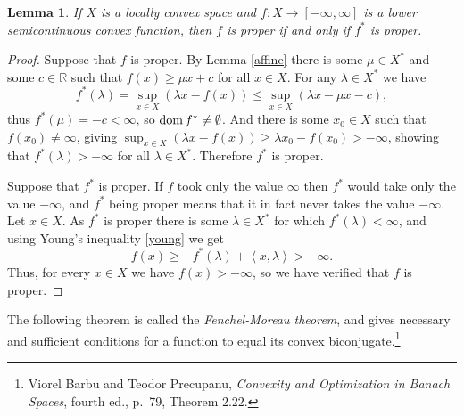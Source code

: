 \documentclass{article}
\newcommand{\inner}[2]{\left\langle #1, #2 \right\rangle}
\newcommand{\dom}{\ensuremath\mathrm{dom}\,}
\newtheorem{lemma}[theorem]{Lemma}
\theoremstyle{definition}
\begin{document}
\begin{lemma}
If $X$ is a locally convex space and $f:X \to [-\infty,\infty]$ is a lower semicontinuous convex function, then $f$ is proper if and only if $f^*$ is proper.
\label{properiff}
\end{lemma}
\begin{proof}
Suppose that $f$ is proper.
By Lemma \ref{affine} there is some $\mu \in X^*$ and some $c \in \mathbb{R}$ such that 
$f(x) \geq \mu x + c$ for all $x \in X$. For
any $\lambda  \in X^*$ we have
\[
f^*(\lambda) = \sup_{x \in X} (\lambda x-f(x)) \leq \sup_{x \in X} (\lambda x -\mu x-c),
\]
thus $f^*(\mu)=-c < \infty$, so $\dom f^* \neq \emptyset$. And there is some $x_0 \in X$ such that
$f(x_0) \neq \infty$, giving $\sup_{x \in X} (\lambda x -f(x)) \geq \lambda x_0 - f(x_0)>-\infty$, showing
that $f^*(\lambda)>-\infty$ for all $\lambda \in X^*$. Therefore $f^*$ is proper.

Suppose that $f^*$ is proper. If $f$ took only the value $\infty$ then $f^*$ would take only  the value $-\infty$, and $f^*$ being proper means that
it in fact never takes the value $-\infty$. Let $x \in X$. As $f^*$ is proper there is some $\lambda \in X^*$ for which
$f^*(\lambda) < \infty$, and using  Young's inequality \eqref{young} we get
\[
f(x) \geq - f^*(\lambda) +\inner{x}{\lambda}>-\infty.
\]
Thus, for every $x \in X$ we have $f(x)>-\infty$, so we have verified that $f$ is proper.
\end{proof}


The following theorem is called the {\em Fenchel-Moreau theorem}, and gives necessary and sufficient conditions for 
 a function to equal  its convex biconjugate.\footnote{Viorel Barbu and Teodor Precupanu, {\em Convexity and Optimization in Banach Spaces}, fourth ed., p.~79, Theorem 2.22.}
\end{document}
